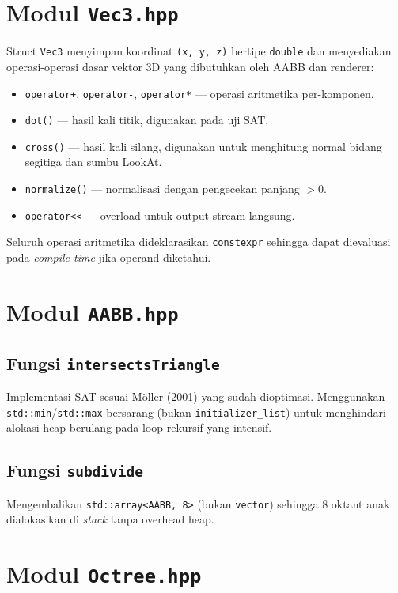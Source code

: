 \documentclass[12pt, a4paper]{report}
\begin{document}
\section{Modul \texttt{Vec3.hpp}}

Struct \texttt{Vec3} menyimpan koordinat \texttt{(x, y, z)} bertipe
\texttt{double} dan menyediakan operasi-operasi dasar vektor 3D yang
dibutuhkan oleh AABB dan renderer:

\begin{itemize}
  \item \texttt{operator+}, \texttt{operator-}, \texttt{operator*}
        — operasi aritmetika per-komponen.
  \item \texttt{dot()} — hasil kali titik, digunakan pada uji SAT.
  \item \texttt{cross()} — hasil kali silang, digunakan untuk menghitung
        normal bidang segitiga dan sumbu LookAt.
  \item \texttt{normalize()} — normalisasi dengan pengecekan panjang $> 0$.
  \item \texttt{operator<<} — overload untuk output stream langsung.
\end{itemize}

Seluruh operasi aritmetika dideklarasikan \texttt{constexpr} sehingga dapat
dievaluasi pada \textit{compile time} jika operand diketahui.

\section{Modul \texttt{AABB.hpp}}

\subsection{Fungsi \texttt{intersectsTriangle}}

Implementasi SAT sesuai Möller (2001) yang sudah dioptimasi.
Menggunakan \texttt{std::min}/\texttt{std::max} bersarang (bukan
\texttt{initializer\_list}) untuk menghindari alokasi heap berulang pada
loop rekursif yang intensif.

\subsection{Fungsi \texttt{subdivide}}

Mengembalikan \texttt{std::array<AABB, 8>} (bukan \texttt{vector}) sehingga
8 oktant anak dialokasikan di \textit{stack} tanpa overhead heap.

\section{Modul \texttt{Octree.hpp}}
\end{document}
